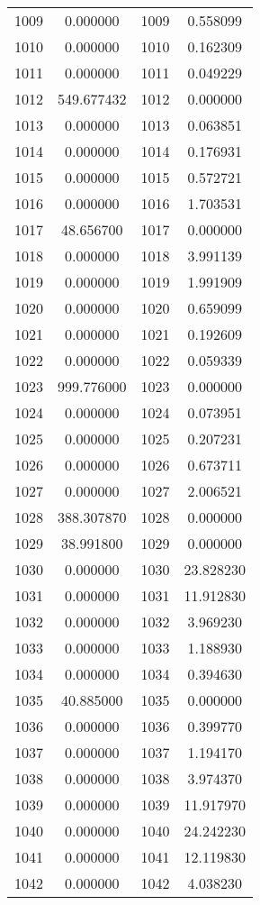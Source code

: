 \documentclass[12pt]{article}
\begin{document}
\begin{longtable}{@{}cccc@{}}
1009 & 0.000000 & 1009 & 0.558099 \\
1010 & 0.000000 & 1010 & 0.162309 \\
1011 & 0.000000 & 1011 & 0.049229 \\
1012 & 549.677432 & 1012 & 0.000000 \\
1013 & 0.000000 & 1013 & 0.063851 \\
1014 & 0.000000 & 1014 & 0.176931 \\
1015 & 0.000000 & 1015 & 0.572721 \\
1016 & 0.000000 & 1016 & 1.703531 \\
1017 & 48.656700 & 1017 & 0.000000 \\
1018 & 0.000000 & 1018 & 3.991139 \\
1019 & 0.000000 & 1019 & 1.991909 \\
1020 & 0.000000 & 1020 & 0.659099 \\
1021 & 0.000000 & 1021 & 0.192609 \\
1022 & 0.000000 & 1022 & 0.059339 \\
1023 & 999.776000 & 1023 & 0.000000 \\
1024 & 0.000000 & 1024 & 0.073951 \\
1025 & 0.000000 & 1025 & 0.207231 \\
1026 & 0.000000 & 1026 & 0.673711 \\
1027 & 0.000000 & 1027 & 2.006521 \\
1028 & 388.307870 & 1028 & 0.000000 \\
1029 & 38.991800 & 1029 & 0.000000 \\
1030 & 0.000000 & 1030 & 23.828230 \\
1031 & 0.000000 & 1031 & 11.912830 \\
1032 & 0.000000 & 1032 & 3.969230 \\
1033 & 0.000000 & 1033 & 1.188930 \\
1034 & 0.000000 & 1034 & 0.394630 \\
1035 & 40.885000 & 1035 & 0.000000 \\
1036 & 0.000000 & 1036 & 0.399770 \\
1037 & 0.000000 & 1037 & 1.194170 \\
1038 & 0.000000 & 1038 & 3.974370 \\
1039 & 0.000000 & 1039 & 11.917970 \\
1040 & 0.000000 & 1040 & 24.242230 \\
1041 & 0.000000 & 1041 & 12.119830 \\
1042 & 0.000000 & 1042 & 4.038230 \\

\end{longtable}
\end{document}
